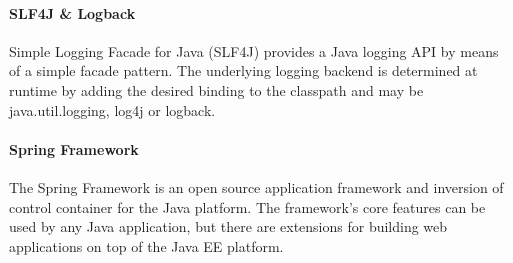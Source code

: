 \paragraph{SLF4J \& Logback}
Simple Logging Facade for Java (SLF4J) provides a Java logging API by means
of a simple facade pattern. The underlying logging backend is determined
at runtime by adding the desired binding to the classpath and may be
java.util.logging, log4j or logback.

\paragraph{Spring Framework}
The Spring Framework is an open source application framework and inversion
of control container for the Java platform. The framework's core features
can be used by any Java application, but there are extensions for building
web applications on top of the Java EE platform.